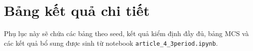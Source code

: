 \section*{Bảng kết quả chi tiết}

Phụ lục này sẽ chứa các bảng theo seed, kết quả kiểm định đầy đủ, bảng MCS và các kết quả bổ sung được sinh từ notebook \texttt{article\_4\_3period.ipynb}.
